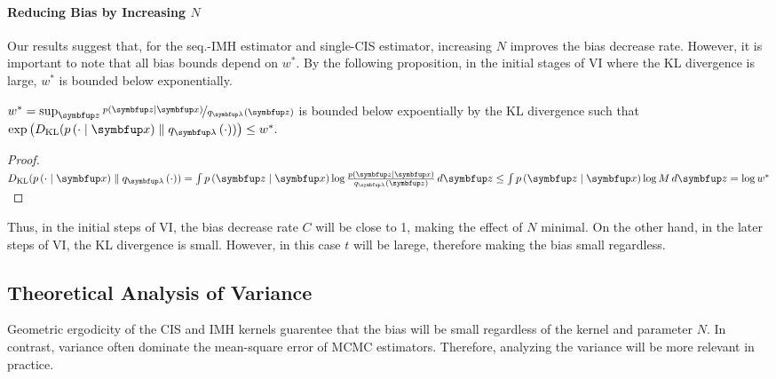 \paragraph{Reducing Bias by Increasing \(N\)}
Our results suggest that, for the seq.-IMH estimator and single-CIS estimator, increasing \(N\) improves the bias decrease rate.
However, it is important to note that all bias bounds depend on \(w^*\).
By the following proposition, in the initial stages of VI where the KL divergence is large, \(w^*\) is bounded below exponentially.
%
\begin{proposition}
  \(w^* = \sup_{\vz} \nicefrac{p\left(\vz\mid\vx\right)}{q_{\vlambda}\left(\vz\right)} \) is bounded below expoentially by the KL divergence such that
  \(
  \exp\left(\DKL{p\left(\cdot\mid\vx\right)}{ q_{\vlambda}\left(\cdot\right) }\right) \leq w^*.
  \)
  \begin{proof}
    \(
    \DKL{p\left(\cdot\mid\vx\right)}{ q_{\vlambda}\left(\cdot\right) }
    = \int p\left(\vz\mid\vx\right) \log \frac{p\left(\vz\mid\vx\right)}{q_{\vlambda}\left(\vz\right)}\,d\vz
    \leq \int p\left(\vz\mid\vx\right) \log M \, d\vz = \log w^*
    \)
  \end{proof}
\end{proposition}
%
Thus, in the initial steps of VI, the bias decrease rate \(C\) will be close to 1, making the effect of \(N\) minimal.
On the other hand, in the later steps of VI, the KL divergence is small.
However, in this case \(t\) will be larege, therefore making the bias small regardless.

\subsection{Theoretical Analysis of Variance}
Geometric ergodicity of the CIS and IMH kernels guarentee that the bias will be small regardless of the kernel and parameter \(N\).
In contrast, variance often dominate the mean-square error of MCMC estimators.
Therefore, analyzing the variance will be more relevant in practice.





